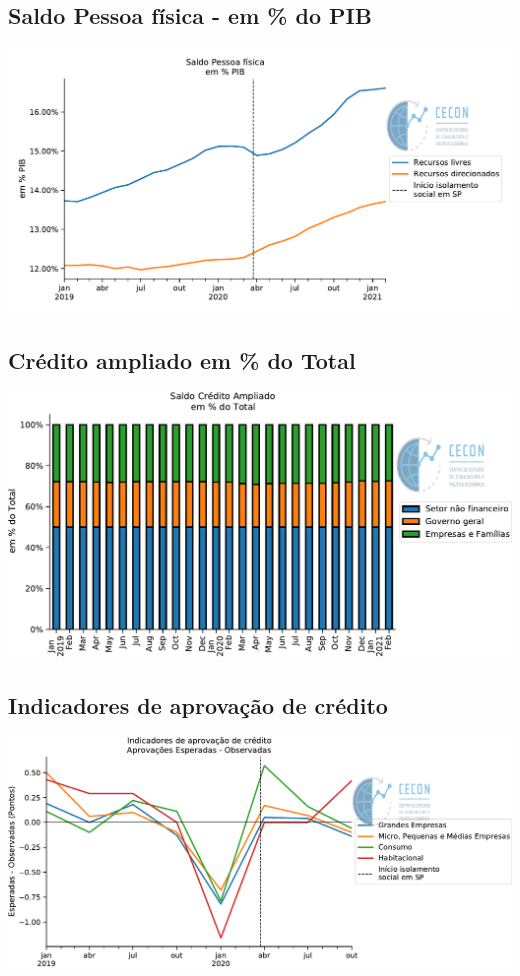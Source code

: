 \documentclass{SelfArx}
\begin{document}
\subsection*{Saldo Pessoa física - em \% do PIB}
\label{sec:orgecf9c59}

\begin{center}
\includegraphics[width=.9\linewidth]{./figs/Credito/SaldoPF_PIB.pdf}
\end{center}


\subsection*{Crédito ampliado em \% do Total}
\label{sec:org3c1407e}

\begin{center}
\includegraphics[width=.9\linewidth]{./figs/Credito/SaldoCreditoAmpliado_Total.pdf}
\end{center}

\subsection*{Indicadores de aprovação de crédito}
\label{sec:orga416685}

\begin{center}
\includegraphics[width=.9\linewidth]{./figs/Credito/PTC.pdf}
\end{center}
\end{document}
